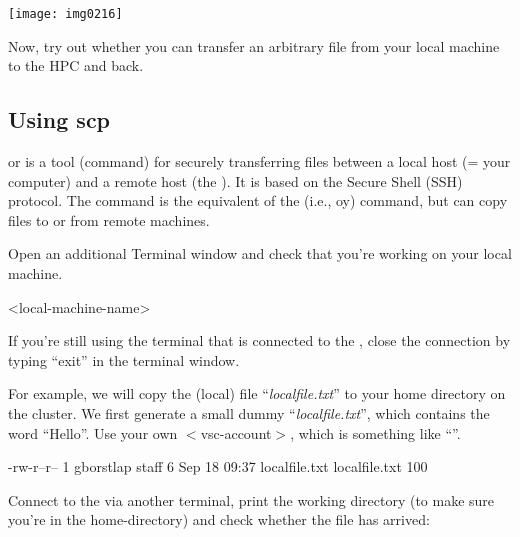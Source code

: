   \begin{center}
  \texttt{[image: img0216]}
  \end{center}

  Now, try out whether you can transfer an arbitrary file from your local
  machine to the HPC and back.

\fi

\ifmacORlinux
  \subsection{Using scp}

   or  is a tool (command) for securely
  transferring files between a local host (= your computer) and a remote host
  (the \hpc). It is based on the Secure Shell (SSH) protocol.  The 
  command is the equivalent of the   (i.e., oy)
  command, but can copy files to or from remote machines.

  Open an additional Terminal window and check that you're working on your local
  machine.

  \begin{prompt}
  <local-machine-name>
  \end{prompt}

  If you're still using the terminal that is connected to the \hpc, close the
  connection by typing ``exit'' in the terminal window.

  For example, we will copy the (local) file ``\emph{localfile.txt}'' to your
  home directory on the \hpc cluster. We first generate a small dummy
  ``\emph{localfile.txt}'', which contains the word ``Hello''.  Use your own
  $<$vsc-account$>$, which is something like ``\emph{\userid}''.

  \begin{prompt}
  -rw-r--r-- 1 gborstlap  staff   6 Sep 18 09:37 localfile.txt
  localfile.txt    100%
  \end{prompt}

  Connect to the \hpc via another terminal, print the working directory (to make
  sure you're in the home-directory) and check whether the file has arrived:

